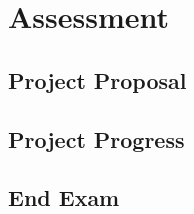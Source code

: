\chapter{Assessment}\label{cha:assessment}


\section{Project Proposal}

\section{Project Progress}


\section{End Exam} 


